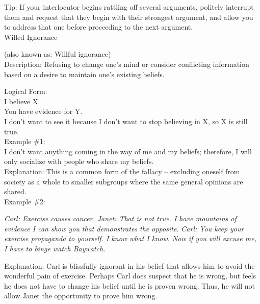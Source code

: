 \documentclass[a4paper,12pt,single,pdftex]{scrartcl}
\begin{document}
    
      Tip: If your interlocutor begins rattling off several arguments,  politely interrupt them and request that they begin with their strongest argument, and allow you to address that one before proceeding to the next argument.
    \\

  

Willed Ignorance
    
      (also known as: Willful ignorance)
    \\

  
    Description: Refusing to change one’s mind or consider conflicting information based on a desire to maintain one's existing beliefs.

    
      Logical Form:
    \\

    
      I believe X.
    \\

    
      You have evidence for Y.
    \\

    
      I don’t want to see it because I don't want to stop believing in X, so X is still true.
    \\

    
      Example \#1:
    \\

    
      I don’t want anything coming in the way of me and my beliefs; therefore, I will only socialize with people who share my beliefs.
    \\

    
      Explanation: This is a common form of the fallacy -- excluding oneself from society as a whole to smaller subgroups where the same general opinions are shared.
    \\

    Example \#2:

    
      
    
    
      {\em Carl: Exercise causes cancer.} \newline
{\em Janet: That is not true. I have mountains of evidence I can show you that demonstrates the opposite.} \newline
{\em Carl: You keep your exercise propaganda to yourself. I know what I know. Now if you will excuse me, I have to binge watch Baywatch.}
    
    
      
    
    
      Explanation: Carl is blissfully ignorant in his belief that allows him to avoid the wonderful pain of exercise. Perhaps Carl does suspect that he is wrong, but feels he does not have to change his belief until he is proven wrong. Thus, he will not allow Janet the opportunity to prove him wrong.
    
\end{document}
